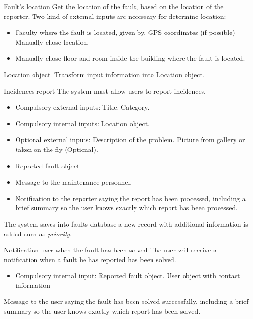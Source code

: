 
\begin{requirement}{Fault's location}
\reqdesc Get the location of the fault, based on the location of the reporter.
\reqin Two kind of external inputs are necessary for determine location:
\begin{itemize}
\item Faculty where the fault is located, given by.
\subitem GPS coordinates (if possible).
\subitem Manually chose location.
\item Manually chose floor and room inside the building where the fault is located.
\end{itemize}
\reqout Location object.
\reqsteps Transform input information into Location object.
\end{requirement}

\begin{requirement}{Incidences report}
\reqdesc The system must allow users to report incidences.
\reqin 
\begin{itemize}
	\item Compulsory external inputs:
	\subitem Title.
	\subitem Category.
	\item Compulsory internal inputs:
	\subitem Location object.
	\item Optional external inputs:
	\subitem Description of the problem.
	\subitem Picture from gallery or taken on the fly (Optional).
\end{itemize}
\reqout
\begin{itemize}
	\item Reported fault object.
	\item Message to the maintenance personnel.
	\item Notification to the reporter saying the report has been processed, including a brief summary so the user knows exactly which report has been processed.
\end{itemize}
\reqsteps The system saves into faults database a new record with additional information is added such as \textit{priority}.
\end{requirement}

\begin{requirement}{Notification user when the fault has been solved}
\reqdesc The user will receive a notification when a fault he has reported has been solved.
\reqin
\begin{itemize}
	\item Compulsory internal input:
 	\subitem Reported fault object.
 	\subitem User object with contact information.
 \end{itemize}
\reqout Message to the user saying the fault has been solved successfully, including a brief summary so the user knows exactly which report has been solved.
\end{requirement}

